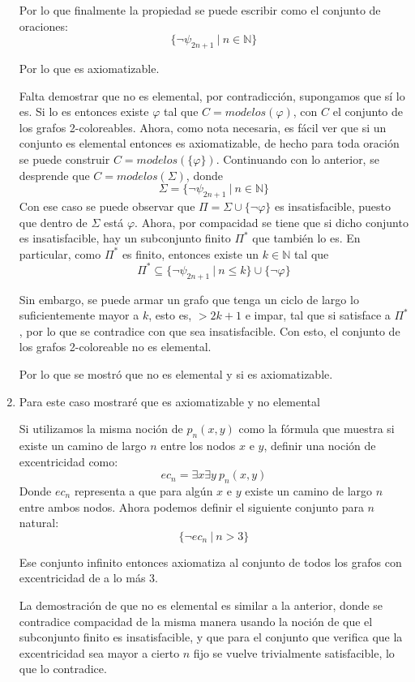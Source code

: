 \documentclass[letterpaper,10pt]{article}
\begin{document}
\begin{enumerate}
    Por lo que finalmente la propiedad se puede escribir como el conjunto de oraciones:
    $$\{\neg\psi_{2n+1} \ | \ n \in \mathbb{N}\}$$

    Por lo que es axiomatizable.

    Falta demostrar que no es elemental, por contradicción, supongamos que sí lo es. Si lo es entonces existe $\varphi$ tal que $C=modelos(\varphi)$, con $C$ el conjunto de los grafos 2-coloreables. Ahora, como nota necesaria, es fácil ver que si un conjunto es elemental entonces es axiomatizable, de hecho para toda oración se puede construir $C=modelos(\{\varphi\})$. Continuando con lo anterior, se desprende que $C=modelos(\Sigma)$, donde
    $$\Sigma = \{\neg\psi_{2n+1} \ | \ n \in \mathbb{N}\}$$
    Con ese caso se puede observar que $\Pi = \Sigma \cup \{\neg\varphi\}$ es insatisfacible, puesto que dentro de $\Sigma$ está $\varphi$. Ahora, por compacidad se tiene que si dicho conjunto es insatisfacible, hay un subconjunto finito $\Pi^*$ que también lo es. En particular, como $\Pi^*$ es finito, entonces existe un $k \in \mathbb{N}$ tal que
    $$\Pi^* \subseteq \{\neg\psi_{2n+1} \ | \ n \leq k\} \cup \{\neg\varphi\}$$

    Sin embargo, se puede armar un grafo que tenga un ciclo de largo lo suficientemente mayor a $k$, esto es, $> 2k+1$ e impar, tal que si satisface a $\Pi^*$, por lo que se contradice con que sea insatisfacible. Con esto, el conjunto de los grafos 2-coloreable no es elemental.

    Por lo que se mostró que no es elemental y si es axiomatizable.

    \item Para este caso mostraré que es axiomatizable y no elemental

    Si utilizamos la misma noción de $p_n(x,y)$ como la fórmula que muestra si existe un camino de largo $n$ entre los nodos $x$ e $y$, definir una noción de excentricidad como:
    $$ec_n = \exists x \exists y \ p_n(x, y)$$
    Donde $ec_n$ representa a que para algún $x$ e $y$ existe un camino de largo $n$ entre ambos nodos. Ahora podemos definir el siguiente conjunto para $n$ natural:
    $$\{\neg ec_n \ | \ n > 3\}$$

    Ese conjunto infinito entonces axiomatiza al conjunto de todos los grafos con excentricidad de a lo más 3.

    La demostración de que no es elemental es similar a la anterior, donde se contradice compacidad de la misma manera usando la noción de que el subconjunto finito es insatisfacible, y que para el conjunto que verifica que la excentricidad sea mayor a cierto $n$ fijo se vuelve trivialmente satisfacible, lo que lo contradice.


\end{enumerate}
\end{document}
